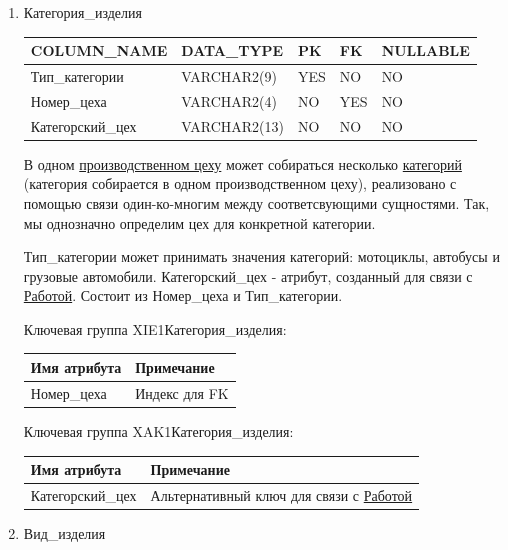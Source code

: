 \begin{enumerate}
    \item{Категория\_изделия}

    \begin{tabular}{|p{7cm}|p{3cm}|p{1cm}|p{1cm}|p{3cm}|} \hline

        {\bf COLUMN\_NAME} & {\bf DATA\_TYPE} & {\bf PK} & {\bf FK} & {\bf NULLABLE} \\ \hline
        Тип\_категории & VARCHAR2(9) & YES & NO & NO \\ \hline
        Номер\_цеха & VARCHAR2(4) & NO & YES & NO \\ \hline
        Категорский\_цех & VARCHAR2(13) & NO & NO & NO \\ \hline

    \end{tabular}

    В одном \underline{производственном цеху} может собираться несколько \underline{категорий} (категория собирается в одном производственном цеху), реализовано с помощью связи один-ко-многим между соответсвующими сущностями.
    Так, мы однозначно определим цех для конкретной категории.

    Тип\_категории может принимать значения категорий: мотоциклы, автобусы и грузовые автомобили.
    Категорский\_цех - атрибут, созданный для связи с \underline{Работой}. Состоит из Номер\_цеха и Тип\_категории.

    Ключевая группа XIE1Категория\_изделия:

    \begin{tabular}{|p{7cm}|p{9.3cm}|} \hline

        {\bf Имя атрибута} & {\bf Примечание} \\ \hline
        Номер\_цеха & Индекс для FK \\ \hline

    \end{tabular}

    Ключевая группа XAK1Категория\_изделия:

    \begin{tabular}{|p{7cm}|p{9.3cm}|} \hline

        {\bf Имя атрибута} & {\bf Примечание} \\ \hline
        Категорский\_цех & Альтернативный ключ для связи с \underline{Работой} \\ \hline

    \end{tabular}

    \item{Вид\_изделия}


\end{enumerate}
